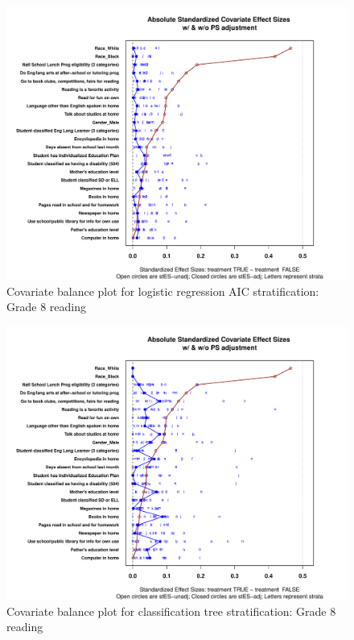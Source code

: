 \begin{figure}
\begin{center}
\includegraphics[width=\textwidth]{../Figures2009/g8read-lrAIC-balance.pdf}
\caption{Covariate balance plot for logistic regression AIC stratification: Grade 8 reading}
\end{center}
\end{figure}

\begin{figure}
\begin{center}
\includegraphics[width=\textwidth]{../Figures2009/g8read-tree-balance.pdf}
\caption{Covariate balance plot for classification tree stratification: Grade 8 reading}
\end{center}
\end{figure}

